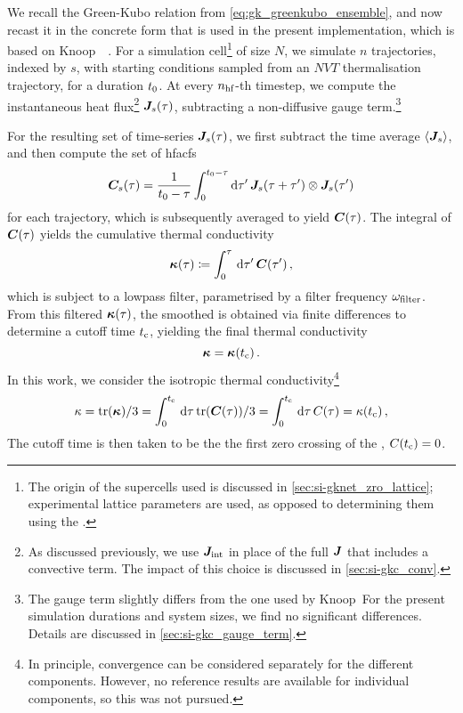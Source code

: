 We recall the Green-Kubo relation from \cref{eq:gk_greenkubo_ensemble}, and now recast it in the concrete form that is used in the present implementation, which is based on Knoop~\etal{}~\cite{ksc2023t}.
For a simulation cell\footnote[][-2\baselineskip]{The origin of the supercells used is discussed in \cref{sec:si-gknet_zro_lattice}; experimental lattice parameters are used, as opposed to determining them using the \mlp.} of size $N$, we simulate $n$ trajectories, indexed by $s$, with starting conditions sampled from an $NVT$ thermalisation trajectory, for a duration $t_0$.
At every $n_{\text{hf}}$-th timestep, we compute the instantaneous heat flux\footnote{As discussed previously, we use $\boldsymbol{J}_\text{int}$ in place of the full $\boldsymbol{J}$ that includes a convective term. The impact of this choice is discussed in \cref{sec:si-gkc_conv}.} $\boldsymbol{J}_s(\tau)$, subtracting a non-diffusive gauge term.\footnote{
The gauge term slightly differs from the one used by Knoop~\etal For the present simulation durations and system sizes, we find no significant differences.
Details are discussed in \cref{sec:si-gkc_gauge_term}.
}

For the resulting set of time-series $\boldsymbol{J}_s(\tau)$, we first subtract the time average $\braket{\boldsymbol{J}_s}$, and then compute the set of \glspl{hfacf} 
\begin{equation}
  \boldsymbol{C}_s(\tau) = \frac{1}{t_0-\tau} \int_0^{t_0-\tau} \text{d} \tau' \, \boldsymbol{J}_s(\tau + \tau') \otimes \boldsymbol{J}_s(\tau')
\end{equation}
for each trajectory, which is subsequently averaged to yield $\boldsymbol{C}(\tau)$.
The integral of $\boldsymbol{C}(\tau)$ yields the cumulative thermal conductivity
\begin{equation}
  \boldsymbol{\kappa}(\tau) \coloneqq \int_0^{\tau} \, \text{d} \tau'\, \boldsymbol{C}(\tau') \, ,
\end{equation}
which is subject to a lowpass filter, parametrised by a filter frequency $\omega_{\text{filter}}$.
From this filtered $\boldsymbol{\kappa}(\tau)$, the smoothed \hfacf is obtained via finite differences to determine a cutoff time $t_{\text{c}}$, yielding the final thermal conductivity
\begin{equation}
  \boldsymbol{\kappa} = \boldsymbol{\kappa}(t_{\text{c}}) \, .
\end{equation}
In this work, we consider the isotropic thermal conductivity\footnote{
  In principle, convergence can be considered separately for the different components. However, no reference results are available for individual components, so this was not pursued.
}
\begin{align}
    \kappa
    = \trace{\tk} / 3
    = 
    \int_0^{\tc} \,
    \intd \tau\,
    \trace{\ehfacft(\tau)}/3
    =
    \int_0^{\tc} \,
    \intd \tau\,
    \ehfacf(\tau)
    = \kappa(\tc)
    \,,
    \label{eq:gkc_gk}
\end{align}
The cutoff time is then taken to be the the first zero crossing of the \hfacf, $C(t_{\text{c}}) = 0$.

